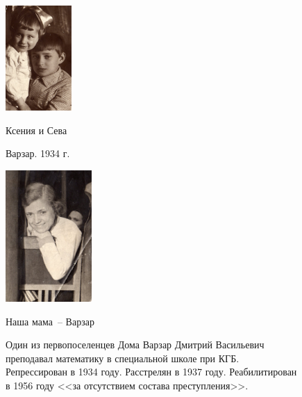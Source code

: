 \documentclass[utf8x, 12pt]{G7-32a} %
\begin{document}
\frontmatter %


\thispagestyle{empty} 

\begin{figure}[h!]
    \caption{Один из первопоселенцев Дома Варзар Дмитрий Васильевич преподавал математику в специальной школе при КГБ. Репрессирован в 1934 году. Расстрелян в 1937 году. Реабилитирован в 1956 году <<за отсутствием состава преступления>>.}
    \begin{minipage}[h!]{40mm}
         \vspace{30pt}
         \begin{center}
         \vspace{-15pt}
         \includegraphics[height=40mm]{inc/Varzar/11.jpg} 
         \end{center}
         \itshape{\hspace{20pt}Ксения и Сева 
         
         \hspace{20pt}Варзар. 1934 г.}
    \end{minipage}
    \hfill
   \begin{minipage}[h]{55mm}
       \begin{center}
       \includegraphics[height=50mm]{inc/Varzar/12.jpg} 
       \end{center}
       \itshape{\hspace{20pt}Наша мама~-- Варзар 
       
}
\end{minipage}
\end{figure}
\end{document}
